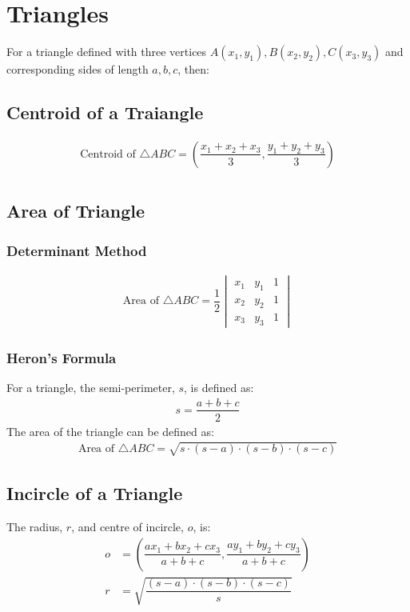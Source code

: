 \documentclass[../main.tex]{subfile}
\begin{document}
\chapter{Triangles}
For a triangle defined with three vertices $A(x_1,y_1),B(x_2,y_2),C(x_3,y_3)$ and corresponding sides of length $a,b,c$, then:

\section{Centroid of a Traiangle}
	\begin{align}
			\text{Centroid of }\triangle ABC=(\dfrac{x_1+x_2+x_3}{3},\dfrac{y_1+y_2+y_3}{3})\\
	\end{align}

\section{Area of Triangle}

\subsection{Determinant Method}
	\begin{align}
		\text{Area of }\triangle ABC =\dfrac{1}{2}\begin{vmatrix}x_1&y_1&1\\x_2&y_2&1\\x_3&y_3&1\end{vmatrix}
	\end{align}

\subsection{Heron's Formula}
	For a triangle, the semi-perimeter, $s$, is defined as:
		\begin{align}
			s=\dfrac{a+b+c}{2}\nonumber
		\end{align}
	The area of the triangle can be defined as:
	\begin{align}
		\text{Area of }\triangle ABC = \sqrt{s \cdot (s-a) \cdot (s-b) \cdot (s-c)}
	\end{align}

\section{Incircle of a Triangle}
	The radius, $r$, and centre of incircle, $o$, is:
	\begin{align}
		o & = \left( \dfrac{ a x_1 + b x_2 + c x_3}{a + b + c},\dfrac{a y_1 + b y_2 + c y_3}{a + b + c} \right)\\
		r & = \sqrt{ \dfrac{ (s-a) \cdot (s-b) \cdot (s-c) }{s}}\\
	\end{align}
\end{document}
